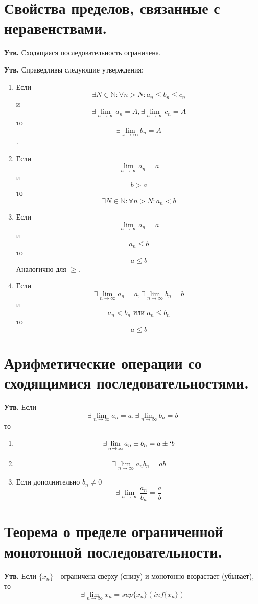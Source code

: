 \documentclass[a4paper,12pt]{article}
\begin{document}
\begin{flushleft}
\section{Свойства пределов, связанные с неравенствами.}

	\textbf{Утв.} Сходящаяся последовательность ограничена.

	\textbf{Утв.} Справедливы следующие утверждения:
	\begin{enumerate}
	\item Если $$\exists N \in \mathbb{N}: \forall n > N: a_n \leq b_n \leq c_n$$ и $$\exists \lim_{n \to \infty} a_n = A, \exists \lim_{n \to \infty} c_n = A$$ то $$\exists \lim_{x \to \infty} b_n = A$$.
	\item Если $$\lim_{n \to \infty} a_n = a$$ и $$b > a$$ то $$\exists N \in \mathbb{N}: \forall n > N: a_n < b$$
	\item Если $$\lim_{n \to \infty} a_n = a$$ и $$a_n \leq b$$ то $$a \leq b$$ Аналогично для $\geq$.
	\item Если $$\exists \lim_{n \to \infty} a_n = a, \exists \lim_{n \to \infty} b_n = b$$ и $$a_n < b_n \text{ или } a_n \leq b_n$$ то $$a \leq b$$ 
	\end{enumerate}
	
\section{Арифметические операции со сходящимися последовательностями.}

	\textbf{Утв.} Если $$\exists \lim_{n \to \infty} a_n = a, \exists \lim_{n \to \infty} b_n = b$$ то 
	\begin{enumerate}
	\item $$\exists \lim_{n \to \infty} a_n \pm b_n = a \pm` b$$
	\item $$\exists \lim_{n \to \infty} a_n b_n = a b$$
	\item Если дополнительно $b_n \neq 0$ $$\exists \lim_{n \to \infty} \dfrac{a_n}{b_n} = \dfrac{a}{b}$$
	\end{enumerate}
	
\section{Теорема о пределе ограниченной монотонной последовательности.}

	\textbf{Утв.} Если $\{x_n\}$ - ограничена сверху (снизу) и монотонно возрастает (убывает), то $$\exists \lim_{n \to \infty} x_n = sup\{x_n\} (inf\{x_n\})$$


\end{flushleft}
\end{document}
